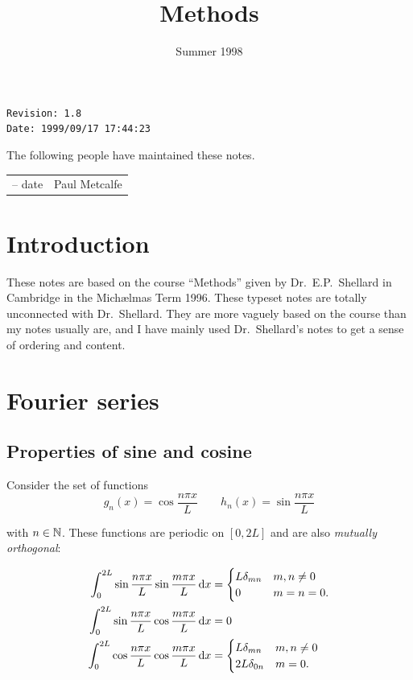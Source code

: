 \documentclass{notes}
\theoremstyle{plain}
\begin{document}
\frontmatter
\title{Methods}
\date{Summer 1998}
\maketitle

\thispagestyle{empty}
\noindent\verb$Revision: 1.8 $\hfill\\
\noindent\verb$Date: 1999/09/17 17:44:23 $\hfill\

\vspace{1.5in}

The following people have maintained these notes.

\begin{center}
\begin{tabular}{ r  l}
-- date & Paul Metcalfe
\end{tabular}
\end{center}

\tableofcontents

\chapter{Introduction}

These notes are based on the course ``Methods'' given by
Dr.~E.P.~Shellard in Cambridge in the Mich\ae lmas Term 1996.  These
typeset notes are totally unconnected with Dr.~Shellard.  They are
more vaguely based on the course than my notes usually are, and I have
mainly used Dr.~Shellard's notes to get a sense of ordering and
content.

\alsoavailable
\archimcopyright

\mainmatter

\chapter{Fourier series}

\section{Properties of sine and cosine}

Consider the set of functions
\[
g_n(x) = \cos \frac{n \pi x}{L} \qquad h_n(x) = \sin \frac{n \pi x}{L}
\]

with $n \in \mathbb{N}$.  These functions are periodic on $[0,2L]$ and are
also \emph{mutually orthogonal}:

\begin{align*}
\int_0^{2 L} \sin \frac{n \pi x}{L} \sin \frac{m \pi x}{L}\, \mathrm{d} x
&= \begin{cases}
L \delta_{mn} & m, n \neq 0 \\
0 & m = n = 0.
\end{cases} \\
\int_0^{2L} \sin \frac{n \pi x}{L} \cos \frac{m \pi x}{L}\, \mathrm{d} x & =
0 \\
\int_0^{2L} \cos \frac{n \pi x}{L} \cos \frac{m \pi x}{L}\, \mathrm{d} x & =
\begin{cases}
L \delta_{m n} & m, n \neq 0 \\
2 L \delta_{0 n} & m = 0.
\end{cases}
\end{align*}
\end{document}
